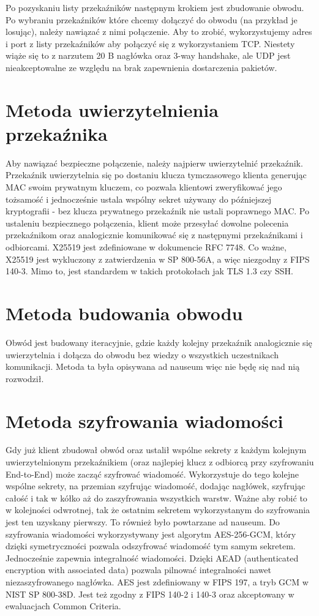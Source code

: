 \documentclass[thesis=inz,faculty=ee]{EE-dyplom}
\begin{document}
    Po pozyskaniu listy przekaźników następnym krokiem jest zbudowanie obwodu. Po wybraniu przekaźników które chcemy dołączyć do obwodu (na przykład je losując),
    należy nawiązać z nimi połączenie. Aby to zrobić, wykorzystujemy adres i port z listy przekaźników aby połączyć się z wykorzystaniem TCP. Niestety wiąże się to
    z narzutem 20 B nagłówka oraz 3-way handshake, ale UDP jest nieakceptowalne ze względu na brak zapewnienia dostarczenia pakietów.

    \section{Metoda uwierzytelnienia przekaźnika}

    Aby nawiązać bezpieczne połączenie, należy najpierw uwierzytelnić przekaźnik. Przekaźnik uwierzytelnia się po dostaniu klucza tymczasowego klienta generując MAC swoim 
    prywatnym kluczem, co pozwala klientowi zweryfikować jego tożsamość i jednocześnie ustala wspólny sekret używany do późniejszej kryptografii - bez klucza 
    prywatnego przekaźnik nie ustali poprawnego MAC. Po ustaleniu bezpiecznego połączenia, klient może przesyłać dowolne polecenia przekaźnikom oraz analogicznie
    komunikować się z następnymi przekaźnikami i odbiorcami. X25519 jest zdefiniowane w dokumencie RFC 7748. Co ważne, X25519 jest wykluczony z zatwierdzenia w SP
    800-56A, a więc niezgodny z FIPS 140-3. Mimo to, jest standardem w takich protokołach jak TLS 1.3 czy SSH.

    \section{Metoda budowania obwodu}

    Obwód jest budowany iteracyjnie, gdzie każdy kolejny przekaźnik analogicznie się uwierzytelnia i dołącza do obwodu bez wiedzy o wszystkich uczestnikach komunikacji.
    Metoda ta była opisywana ad nauseum więc nie będę się nad nią rozwodził.

    \section{Metoda szyfrowania wiadomości}

    Gdy już klient zbudował obwód oraz ustalił wspólne sekrety z każdym kolejnym uwierzytelnionym przekaźnikiem (oraz najlepiej klucz z odbiorcą przy szyfrowaniu End-to-End)
    może zacząć szyfrować wiadomość. Wykorzystuje do tego kolejne wspólne sekrety, na przemian szyfrując wiadomość, dodając nagłówek, szyfrując całość i tak w kółko aż do 
    zaszyfrowania wszystkich warstw. Ważne aby robić to w kolejności odwrotnej, tak że ostatnim sekretem wykorzystanym do szyfrowania jest ten uzyskany pierwszy. To również
    było powtarzane ad nauseum. Do szyfrowania wiadomości wykorzystywany jest algorytm AES-256-GCM, który dzięki symetryczności pozwala odszyfrować wiadomość tym samym sekretem.
    Jednocześnie zapewnia integralność wiadomości. Dzięki AEAD (authenticated encryption with associated data) pozwala pilnować integralności nawet niezaszyfrowanego nagłówka.
    AES jest zdefiniowany w FIPS 197, a tryb GCM w NIST SP 800-38D. Jest też zgodny z FIPS 140-2 i 140-3 oraz akceptowany w ewaluacjach Common Criteria. 
\end{document}
